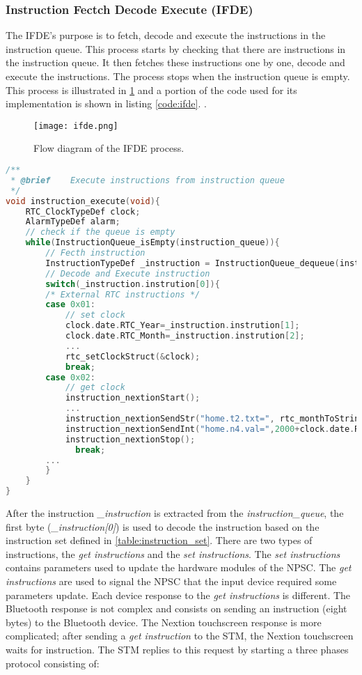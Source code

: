 \subsubsection{Instruction Fectch Decode Execute (IFDE)}\label{IFDE}
The IFDE's purpose is to fetch, decode and execute the instructions in the instruction queue. This process starts by checking that there are instructions in the instruction queue. It then fetches these instructions one by one, decode and execute the instructions. The process stops when the instruction queue is empty. This process is illustrated in \cref{fig:ifde} and a portion of the code used for its implementation is shown in listing \ref{code:ifde}. .
\begin{figure}[ht]
\centering
\texttt{[image: ifde.png]}
\caption{Flow diagram of the IFDE process.}
\label{fig:ifde}
\end{figure}
\begin{lstlisting}[language=C, caption=Instruction Fetch Decode Execute, label=code:ifde]
/**
 * @brief    Execute instructions from instruction queue
 */
void instruction_execute(void){
    RTC_ClockTypeDef clock;
    AlarmTypeDef alarm;
    // check if the queue is empty
    while(InstructionQueue_isEmpty(instruction_queue)){
        // Fecth instruction
        InstructionTypeDef _instruction = InstructionQueue_dequeue(instruction_queue);
        // Decode and Execute instruction
        switch(_instruction.instrution[0]){
        /* External RTC instructions */
        case 0x01:
            // set clock
            clock.date.RTC_Year=_instruction.instrution[1];
            clock.date.RTC_Month=_instruction.instrution[2];
            ...
            rtc_setClockStruct(&clock);
            break;
        case 0x02:
            // get clock
            instruction_nextionStart();
            ...            
            instruction_nextionSendStr("home.t2.txt=", rtc_monthToString(clock.date.RTC_Month) );
            instruction_nextionSendInt("home.n4.val=",2000+clock.date.RTC_Year);
            instruction_nextionStop();
              break;        
        ...
        }
    }
}
\end{lstlisting}
After the instruction \textit{\_instruction} is extracted from the \textit{instruction\_queue}, the first byte (\textit{\_instruction[0]}) is used to decode the instruction based on the instruction set defined in \cref{table:instruction_set}. There are two types of instructions, the \textit{get instructions} and the \textit{set instructions}. The \textit{set instructions} contains parameters used to update the hardware modules of the NPSC. The \textit{get instructions} are used to signal the NPSC that the input device required some parameters update. Each device response to the \textit{get instructions} is different. The Bluetooth response is not complex and consists on sending an instruction (eight bytes) to the Bluetooth device. The Nextion touchscreen response is more complicated; after sending a \textit{get instruction} to the STM, the Nextion touchscreen waits for instruction. The STM replies to this request by starting a three phases protocol consisting of:
